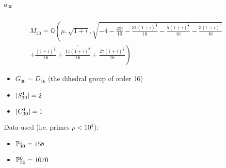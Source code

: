 \subparagraph{$a_{30}$}
\begin{multline*}
	M_{30} = \mathbb{Q}\left(\mu, \sqrt{1+i}, 
	\sqrt{
		-4 
		- \frac{65 i}{16} 
		- \frac{31 \left(1 + i\right)^{\frac{1}{2}}}{16} 
		- \frac{5 \left(1 + i\right)^{\frac{5}{2}}}{16} 
		- \frac{3 \left(1 + i\right)^{3}}{16} 
	}\right. \\
	\left. \overline{
		+ \frac{\left(1 + i\right)^{\frac{7}{2}}}{16} 
		+ \frac{11 \left(1 + i\right)^{2}}{16} 
		+ \frac{27 \left(1 + i\right)^{\frac{3}{2}}}{16}
	}\right)
\end{multline*}
\begin{multicols}{2}
	\begin{itemize}
		\item $G_{30} = D_{16}$ (the dihedral group of order 16)
		\item $| S_{30}^1 | = 2$
		\item $| C_{30}^1 | = 1$
	\end{itemize}
	Data used (i.e. primes $p<10^4$):
	\begin{itemize}
		\item $\mathbb{P}_{30}^1 = 158$
		\item $\mathbb{P}_{30}^0 = 1070$
	\end{itemize}
\end{multicols}


